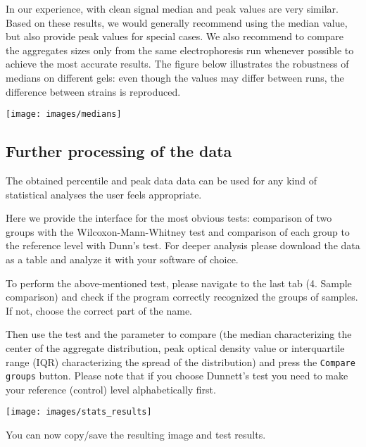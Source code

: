 \documentclass[11pt]{article}
\begin{document}
\begin{enumerate}
In our experience, with clean signal median and peak values are very similar. Based on these results, we would generally recommend using the median value, but also provide peak values for special cases. We also recommend to compare the aggregates sizes only from the same electrophoresis run whenever possible to achieve the most accurate results. The figure below illustrates the robustness of medians on different gels: even though the values may differ between runs, the difference between strains is reproduced.

\texttt{[image: images/medians]}


\subsection*{Further processing of the data}


The obtained percentile and peak data data can be used for any kind of statistical analyses the user feels appropriate. 

Here we provide the interface for the most obvious tests: comparison of two groups with the Wilcoxon-Mann-Whitney test and comparison of each group to the reference level with Dunn's test. For deeper analysis please download the data as a table and analyze it with your software of choice. 


To perform the above-mentioned test, please navigate to the last tab (4. Sample comparison) and check if the program correctly recognized the groups of samples. If not, choose the correct part of the name. 

Then use the test and the parameter to compare (the median characterizing the center of the aggregate distribution, peak optical density value or interquartile range (IQR) characterizing the spread of the distribution) and press the \texttt{Compare groups} button. Please note that if you choose Dunnett's test you need to make your reference (control) level alphabetically first.

\hskip -15mm \texttt{[image: images/stats\_results]}

You can now copy/save the resulting image and test results. 


\end{enumerate}
\end{document}
